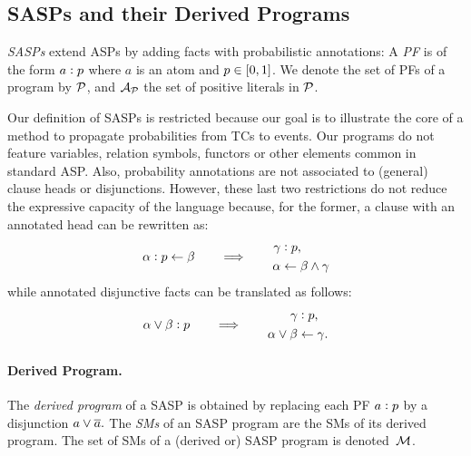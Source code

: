 \documentclass[x11names]{tlp}
\begin{document}
\subsection*{\acsp{SASP} and their Derived Programs}

\emph{\Acfp{SASP}} extend \acp{ASP} by adding facts with probabilistic
annotations: A \textit{\ac{PF}} is of the form $a:p$
where $a$ is an atom and $p\in\intcc{0,1}$.  We denote the set of
\aclp{PF} of a program by $\PROBFset$, and $\PATOMset$ the set of
positive literals in $\PROBFset$.

Our definition of \acp{SASP} is restricted because our goal is to illustrate
the core of a method to propagate probabilities from \aclp{TC} to events. Our
programs do not feature variables, relation symbols, functors or other
elements common in standard \ac{ASP}. Also, probability annotations are not
associated to (general) clause heads or disjunctions. However, these last two
restrictions do not reduce the expressive capacity of the language because,
for the former, a clause with an annotated head can be rewritten as:%
\begin{equation*}
	\probrule{\alpha}{p}{\beta} \qquad \Longrightarrow \qquad
	\begin{aligned}
		\probfact{\gamma & }{p},                       %
		\\
		\alpha           & \clause \beta \wedge \gamma
	\end{aligned}
\end{equation*}
while annotated disjunctive facts
can be translated as follows:
\begin{equation*}
	\probfact{\alpha \vee \beta}{p} \qquad \Longrightarrow \qquad
	\begin{aligned}
		\probfact{\gamma  & }{p},           %
		\\
		\alpha \vee \beta & \clause \gamma.
	\end{aligned}
\end{equation*}

\paragraph{Derived Program.}

The \emph{derived program} of a \ac{SASP} is obtained by replacing each
\acl{PF} $a:p$ by a disjunction $ a \vee \overline{a}. $ The
\textit{\aclp{SM}} of an \acs{SASP} program are the \aclp{SM} of its derived
program. The set of \acp{SM} of a (derived or) \acs{SASP} program is
denoted~$\MODELset$.
\end{document}
